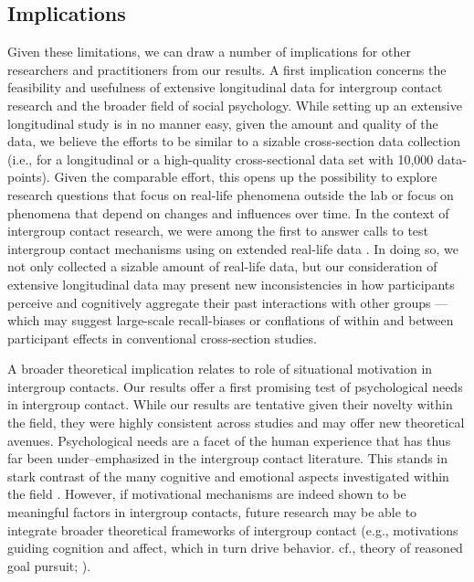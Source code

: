 \documentclass[man, 12pt, a4paper, mask]{apa7}
\theoremstyle{break}
\theoremstyle{plain}
\begin{document}
\subsection{Implications}
Given these limitations, we can draw a number of implications for other researchers and practitioners from our results. A first implication concerns the feasibility and usefulness of extensive longitudinal data for intergroup contact research and the broader field of social psychology. While setting up an extensive longitudinal study is in no manner easy, given the amount and quality of the data, we believe the efforts to be similar to a sizable cross-section data collection (i.e., for a longitudinal or a high-quality cross-sectional data set with 10,000 data-points). Given the comparable effort, this opens up the possibility to explore research questions that focus on real-life phenomena outside the lab or focus on phenomena that depend on changes and influences over time. In the context of intergroup contact research, we were among the first to answer calls to test intergroup contact mechanisms using on extended real-life data \citep[e.g.,][]{Pettigrew2011, MacInnis2015}. In doing so, we not only collected a sizable amount of real-life data, but our consideration of extensive longitudinal data may present new inconsistencies in how participants perceive and cognitively aggregate their past interactions with other groups — which may suggest large-scale recall-biases or conflations of within and between participant effects in conventional cross-section studies.

A broader theoretical implication relates to role of situational motivation in intergroup contacts. Our results offer a first promising test of psychological needs in intergroup contact. While our results are tentative given their novelty within the field, they were highly consistent across studies and may offer new theoretical avenues. Psychological needs are a facet of the human experience that has thus far been under–emphasized in the intergroup contact literature. This stands in stark contrast of the many cognitive \citep[e.g.,][]{Pettigrew1998, Brown2005} and emotional aspects investigated within the field \citep[e.g.,][]{Stephan2008, Paolini2004}. However, if motivational mechanisms are indeed shown to be meaningful factors in intergroup contacts, future research may be able to integrate broader theoretical frameworks of intergroup contact (e.g., motivations guiding cognition and affect, which in turn drive behavior. cf., theory of reasoned goal pursuit; \citealp{Ajzen2019}). 
\end{document}

